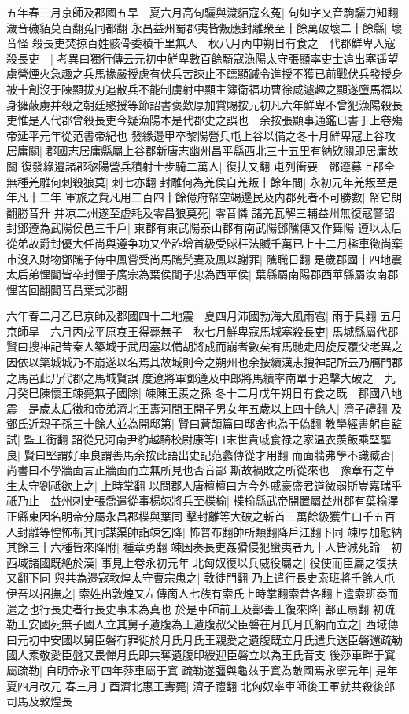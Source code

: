 五年春三月京師及郡國五旱　夏六月高句驪與濊貊寇玄菟|{
	句如字又音駒驪力知翻濊音穢貊莫百翻菟同都翻}
永昌益州蜀郡夷皆叛應封離衆至十餘萬破壞二十餘縣|{
	壞音怪}
殺長吏焚掠百姓骸骨委積千里無人　秋八月丙申朔日有食之　代郡鮮卑入寇殺長吏　|{
	考異曰獨行傳云元初中鮮卑數百餘騎寇漁陽太守張顯率吏士追出塞遥望虜營煙火急趣之兵馬掾嚴授慮有伏兵苦諫止不聼顯䠞令進授不獲已前戰伏兵發授身被十創沒于陳顯拔刃追散兵不能制虜射中顯主簿衛福功曹徐咸遽趣之顯遂墮馬福以身擁蔽虜并殺之朝廷愍授等節詔書褒歎厚加賞賜按元初凡六年鮮卑不曾犯漁陽殺長吏惟是入代郡曾殺長吏今疑漁陽本是代郡史之誤也　余按張顯事通鑑已書于上卷殤帝延平元年從范書帝紀也}
發緣邉甲卒黎陽營兵屯上谷以備之冬十月鮮卑寇上谷攻居庸關|{
	郡國志居庸縣屬上谷郡新唐志幽州昌平縣西北三十五里有納欵關即居庸故關}
復發緣邉諸郡黎陽營兵積射士步騎二萬人|{
	復扶又翻}
屯列衝要　鄧遵募上郡全無種羌雕何刺殺狼莫|{
	刺七亦翻}
封雕何為羌侯自羌叛十餘年間|{
	永初元年羌叛至是年凡十二年}
軍旅之費凡用二百四十餘億府帑空竭邊民及内郡死者不可勝數|{
	帑它朗翻勝音升}
并凉二州遂至虚耗及零昌狼莫死|{
	零音憐}
諸羌瓦解三輔益州無復寇警詔封鄧遵為武陽侯邑三千戶|{
	東郡有東武陽泰山郡有南武陽鄧隲傳又作舞陽}
遵以太后從弟故爵封優大任尚與遵争功又坐詐增首級受賕枉法贓千萬已上十二月檻車徵尚棄市沒入財物鄧隲子侍中鳳嘗受尚馬隲髠妻及鳳以謝罪|{
	隲職日翻}
是歲郡國十四地震　太后弟悝閶皆卒封悝子廣宗為葉侯閶子忠為西華侯|{
	葉縣屬南陽郡西華縣屬汝南郡悝苦回翻閶音昌葉式涉翻}


六年春二月乙巳京師及郡國四十二地震　夏四月沛國勃海大風雨雹|{
	雨于具翻}
五月京師旱　六月丙戌平原哀王得薨無子　秋七月鮮卑寇馬城塞殺長吏|{
	馬城縣屬代郡賢曰搜神記昔秦人築城于武周塞以備胡將成而崩者數矣有馬馳走周旋反覆父老異之因依以築城城乃不崩遂以名焉其故城則今之朔州也余按續漢志搜神記所云乃鴈門郡之馬邑此乃代郡之馬城賢誤}
度遼將軍鄧遵及中郎將馬續率南單于追擊大破之　九月癸巳陳懷王竦薨無子國除|{
	竦陳王羨之孫}
冬十二月戊午朔日有食之既　郡國八地震　是歲太后徵和帝弟濟北王夀河間王開子男女年五歲以上四十餘人|{
	濟子禮翻}
及鄧氏近親子孫三十餘人並為開邸第|{
	賢曰蒼頡篇曰邸舍也為于偽翻}
教學經書躬自監試|{
	監工銜翻}
詔從兄河南尹豹越騎校尉康等曰末世貴戚食禄之家温衣羨飯乘堅驅良|{
	賢曰堅謂好車良謂善馬余按此語出史記范蠡傳從才用翻}
而面牆弗學不識臧否|{
	尚書曰不學牆面言正牆面而立無所見也否音鄙}
斯故禍敗之所從來也　豫章有芝草生太守劉祗欲上之|{
	上時掌翻}
以問郡人唐檀檀曰方今外戚豪盛君道微弱斯豈嘉瑞乎祇乃止　益州刺史張喬遣從事楊竦將兵至楪榆|{
	楪榆縣武帝開置屬益州郡有葉榆澤正縣東因名明帝分屬永昌郡楪與葉同}
擊封離等大破之斬首三萬餘級獲生口千五百人封離等惶怖斬其同謀渠帥詣竦乞降|{
	怖普布翻帥所類翻降戶江翻下同}
竦厚加慰納其餘三十六種皆來降附|{
	種章勇翻}
竦因奏長吏姦猾侵犯蠻夷者九十人皆減死論　初西域諸國既絶於漢|{
	事見上卷永初元年}
北匈奴復以兵威役屬之|{
	役使而臣屬之復扶又翻下同}
與共為邉寇敦煌太守曹宗患之|{
	敦徒門翻}
乃上遣行長史索班將千餘人屯伊吾以招撫之|{
	索姓出敦煌又左傳啇人七族有索氏上時掌翻索昔各翻上遣索班奏而遣之也行長史者行長史事未為真也}
於是車師前王及鄯善王復來降|{
	鄯正扇翻}
初疏勒王安國死無子國人立其舅子遺腹為王遺腹叔父臣磐在月氏月氏納而立之|{
	西域傳曰元初中安國以舅臣磐冇罪徙於月氏月氏王親愛之遺腹既立月氏遣兵送臣磐還疏勒國人素敬愛臣盤又畏憚月氏即共奪遺腹印綬迎臣磐立以為王氏音支}
後莎車畔于窴屬疏勒|{
	自明帝永平四年莎車屬于窴}
疏勒遂彊與龜兹于窴為敵國焉永寧元年|{
	是年夏四月改元}
春三月丁酉濟北惠王夀薨|{
	濟子禮翻}
北匈奴率車師後王軍就共殺後部司馬及敦煌長

